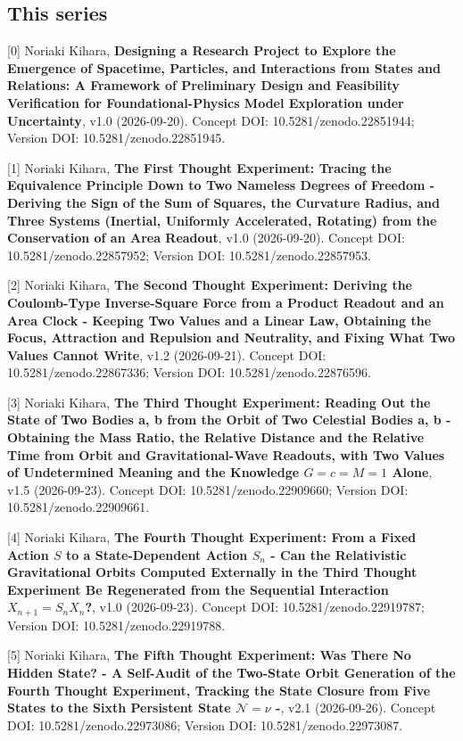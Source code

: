 \documentclass[
  a4paper,
]{article}
\begin{document}
\subsection{This series}\label{this-series}

{[}0{]} Noriaki Kihara, \textbf{Designing a Research Project to Explore
the Emergence of Spacetime, Particles, and Interactions from States and
Relations: A Framework of Preliminary Design and Feasibility
Verification for Foundational-Physics Model Exploration under
Uncertainty}, v1.0 (2026-09-20). Concept DOI: 10.5281/zenodo.22851944;
Version DOI: 10.5281/zenodo.22851945.

{[}1{]} Noriaki Kihara, \textbf{The First Thought Experiment: Tracing
the Equivalence Principle Down to Two Nameless Degrees of Freedom -
Deriving the Sign of the Sum of Squares, the Curvature Radius, and Three
Systems (Inertial, Uniformly Accelerated, Rotating) from the
Conservation of an Area Readout}, v1.0 (2026-09-20). Concept DOI:
10.5281/zenodo.22857952; Version DOI: 10.5281/zenodo.22857953.

{[}2{]} Noriaki Kihara, \textbf{The Second Thought Experiment: Deriving
the Coulomb-Type Inverse-Square Force from a Product Readout and an Area
Clock - Keeping Two Values and a Linear Law, Obtaining the Focus,
Attraction and Repulsion and Neutrality, and Fixing What Two Values
Cannot Write}, v1.2 (2026-09-21). Concept DOI: 10.5281/zenodo.22867336;
Version DOI: 10.5281/zenodo.22876596.

{[}3{]} Noriaki Kihara, \textbf{The Third Thought Experiment: Reading
Out the State of Two Bodies a, b from the Orbit of Two Celestial Bodies
a, b - Obtaining the Mass Ratio, the Relative Distance and the Relative
Time from Orbit and Gravitational-Wave Readouts, with Two Values of
Undetermined Meaning and the Knowledge \(G=c=M=1\) Alone}, v1.5
(2026-09-23). Concept DOI: 10.5281/zenodo.22909660; Version DOI:
10.5281/zenodo.22909661.

{[}4{]} Noriaki Kihara, \textbf{The Fourth Thought Experiment: From a
Fixed Action \(S\) to a State-Dependent Action \(S_n\) - Can the
Relativistic Gravitational Orbits Computed Externally in the Third
Thought Experiment Be Regenerated from the Sequential Interaction
\(X_{n+1}=S_nX_n\)?}, v1.0 (2026-09-23). Concept DOI:
10.5281/zenodo.22919787; Version DOI: 10.5281/zenodo.22919788.

{[}5{]} Noriaki Kihara, \textbf{The Fifth Thought Experiment: Was There
No Hidden State? - A Self-Audit of the Two-State Orbit Generation of the
Fourth Thought Experiment, Tracking the State Closure from Five States
to the Sixth Persistent State \(\mathcal N=\nu\) -}, v2.1 (2026-09-26).
Concept DOI: 10.5281/zenodo.22973086; Version DOI:
10.5281/zenodo.22973087.
\end{document}
